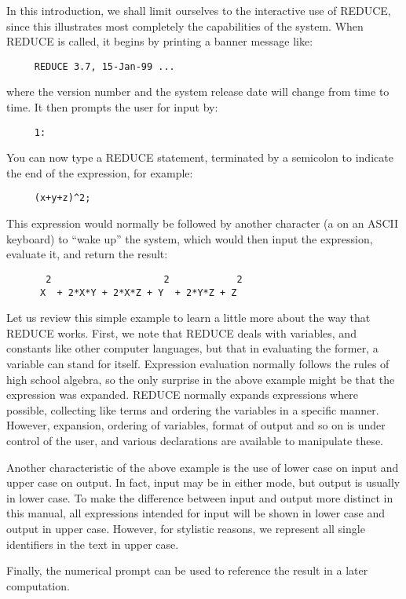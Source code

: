\documentclass[11pt,letterpaper]{book}
\newcommand{\REDUCE}{REDUCE}
\newcommand{\key}[1]{\fbox{\sf #1}}
\begin{document}
In this introduction, we shall limit ourselves to the interactive use of
{\REDUCE}, since this illustrates most completely the capabilities of the
system. When {\REDUCE} is called, it begins by printing a banner message
like:
{\small\begin{verbatim}
     REDUCE 3.7, 15-Jan-99 ...
\end{verbatim}}
where the version number and the system release date will change from time
to time. It then prompts the user for input by:
{\small\begin{verbatim}
     1:
\end{verbatim}}
You can now type a {\REDUCE} statement, terminated by a semicolon to indicate
the end of the expression, for example:
{\small\begin{verbatim}
     (x+y+z)^2;
\end{verbatim}}
This expression would normally be followed by another character (a
\key{Return} on an ASCII keyboard) to ``wake up'' the system, which would
then input the expression, evaluate it, and return the result:
{\small\begin{verbatim}
       2                    2            2
      X  + 2*X*Y + 2*X*Z + Y  + 2*Y*Z + Z
\end{verbatim}}
Let us review this simple example to learn a little more about the way that
{\REDUCE} works. First, we note that {\REDUCE} deals with variables, and
constants like other computer languages, but that in evaluating the former,
a variable can stand for itself. Expression evaluation normally follows
the rules of high school algebra, so the only surprise in the above example
might be that the expression was expanded. {\REDUCE} normally expands
expressions where possible, collecting like terms and ordering the
variables in a specific manner. However, expansion, ordering of variables,
format of output and so on is under control of the user, and various
declarations are available to manipulate these.

Another characteristic of the above example is the use of lower case on
input and upper case on output.  In fact, input may be in either mode, but
output is usually in lower case.  To make the difference between input and
output more distinct in this manual, all expressions intended for input
will be shown in lower case and output in upper case.  However, for
stylistic reasons, we represent all single identifiers in the text in
upper case.

Finally, the numerical prompt can be used to reference the result in a
later computation.
\end{document}
